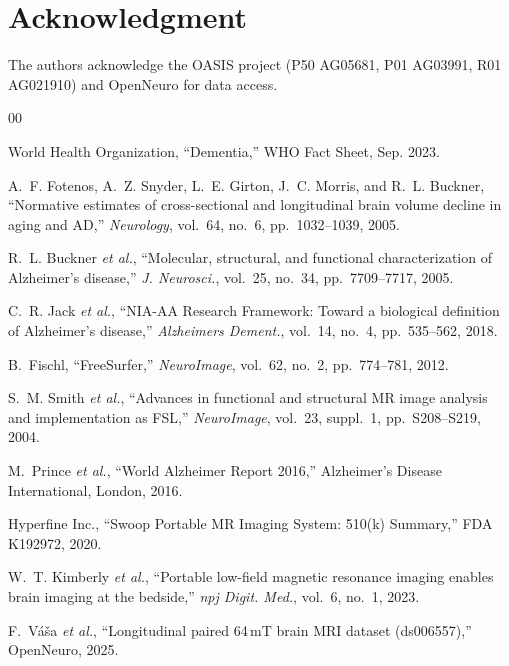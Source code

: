 \documentclass[12pt,a4paper]{article}
\begin{document}
\section*{Acknowledgment}

The authors acknowledge the OASIS project (P50 AG05681, P01 AG03991,
R01 AG021910) and OpenNeuro for data access.

\begin{thebibliography}{00}

World Health Organization, ``Dementia,'' WHO Fact Sheet, Sep. 2023.

A.~F. Fotenos, A.~Z. Snyder, L.~E. Girton, J.~C. Morris, and R.~L. Buckner,
``Normative estimates of cross-sectional and longitudinal brain volume
decline in aging and AD,''
\emph{Neurology}, vol.~64, no.~6, pp.~1032--1039, 2005.

R.~L. Buckner \emph{et al.},
``Molecular, structural, and functional characterization of Alzheimer's
disease,''
\emph{J. Neurosci.}, vol.~25, no.~34, pp.~7709--7717, 2005.

C.~R. Jack \emph{et al.},
``NIA-AA Research Framework: Toward a biological definition of
Alzheimer's disease,''
\emph{Alzheimers Dement.}, vol.~14, no.~4, pp.~535--562, 2018.

B.~Fischl, ``FreeSurfer,''
\emph{NeuroImage}, vol.~62, no.~2, pp.~774--781, 2012.

S.~M. Smith \emph{et al.},
``Advances in functional and structural MR image analysis and
implementation as FSL,''
\emph{NeuroImage}, vol.~23, suppl.~1, pp.~S208--S219, 2004.

M.~Prince \emph{et al.},
``World Alzheimer Report 2016,''
Alzheimer's Disease International, London, 2016.

Hyperfine Inc., ``Swoop Portable MR Imaging System: 510(k) Summary,''
FDA K192972, 2020.

W.~T. Kimberly \emph{et al.},
``Portable low-field magnetic resonance imaging enables brain imaging
at the bedside,''
\emph{npj Digit. Med.}, vol.~6, no.~1, 2023.

F.~V{\'a}{\v s}a \emph{et al.},
``Longitudinal paired 64\,mT brain MRI dataset (ds006557),''
OpenNeuro, 2025.


\end{thebibliography}
\end{document}
